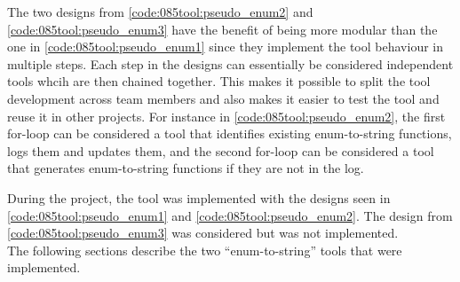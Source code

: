 The two designs from \cref{code:085tool:pseudo_enum2} and \cref{code:085tool:pseudo_enum3} have the benefit of being more modular than the one in \ref{code:085tool:pseudo_enum1} since they implement the tool behaviour in multiple steps.
Each step in the designs can essentially be considered independent tools whcih are then chained together. This makes it possible to split the tool development across team members and also makes it easier to test the tool and reuse it in other projects. For instance in \cref{code:085tool:pseudo_enum2}, the first for-loop can be considered a tool that identifies existing enum-to-string functions, logs them and updates them, and the second for-loop can be considered a tool that generates enum-to-string functions if they are not in the log.

During the project, the tool was implemented with the designs seen in \cref{code:085tool:pseudo_enum1} and \cref{code:085tool:pseudo_enum2}. The design from \cref{code:085tool:pseudo_enum3} was considered but was not implemented. \\The following sections describe the two ``enum-to-string'' tools that were implemented.